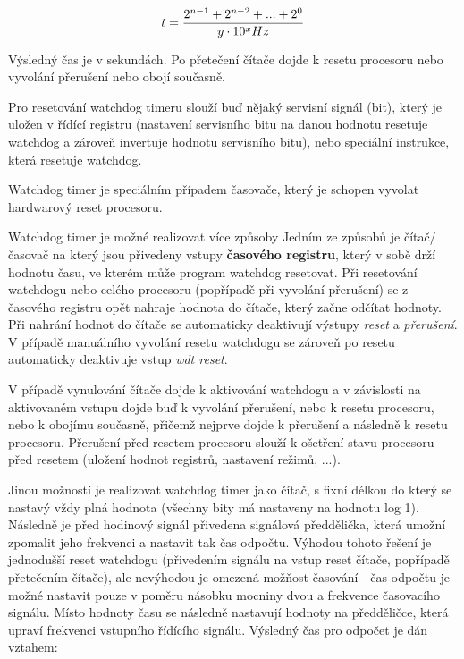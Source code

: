 $$ t = {{2^{n-1} + 2^{n-2} + ... + 2^0} \over y \cdot 10^x Hz}$$ 

Výsledný čas je v sekundách. Po přetečení čítače dojde k resetu procesoru nebo vyvolání přerušení nebo obojí současně. 

Pro resetování watchdog timeru slouží buď nějaký servisní signál (bit), který je uložen v řídící registru (nastavení servisního bitu na danou hodnotu resetuje watchdog a zároveň invertuje hodnotu servisního bitu), nebo speciální instrukce, která resetuje watchdog. 

Watchdog timer je speciálním případem časovače, který je schopen vyvolat hardwarový reset procesoru.

Watchdog timer je možné realizovat více způsoby Jedním ze způsobů je čítač/časovač na který jsou přivedeny vstupy {\bf časového registru}, který v sobě drží hodnotu času, ve kterém může program watchdog resetovat. Při resetování watchdogu nebo celého procesoru (popřípadě při vyvolání přerušení) se z časového registru opět nahraje hodnota do čítače, který začne odčítat hodnoty. Při nahrání hodnot do čítače se automaticky deaktivují výstupy {\it reset} a {\it přerušení}. V případě manuálního vyvolání resetu watchdogu se zároveň po resetu automaticky deaktivuje vstup {\it wdt reset}.

\vskip 4mm
\centerline{}
\vskip 4mm


V případě vynulování čítače dojde k aktivování watchdogu a v závislosti na aktivovaném vstupu dojde buď k vyvolání přerušení, nebo k resetu procesoru, nebo k obojímu současně, přičemž nejprve dojde k přerušení a následně k resetu procesoru. Přerušení před resetem procesoru slouží k ošetření stavu procesoru před resetem (uložení hodnot registrů, nastavení režimů, ...).

Jinou možností je realizovat watchdog timer jako čítač, s fixní délkou do který se nastavý vždy plná hodnota (všechny bity má nastaveny na hodnotu log 1). Následně je před hodinový signál přivedena signálová předdělička, která umožní zpomalit jeho frekvenci a nastavit tak čas odpočtu. Výhodou tohoto řešení je jednodušší reset watchdogu (přivedením signálu na vstup reset čítače, popřípadě přetečením čítače), ale nevýhodou je omezená možňost časování - čas odpočtu je možné nastavit pouze v poměru násobku mocniny dvou a frekvence časovacího signálu. Místo hodnoty času se následně nastavují hodnoty na předděličce, která upraví frekvenci vstupního řídícího signálu. Výsledný čas pro odpočet je dán vztahem:

